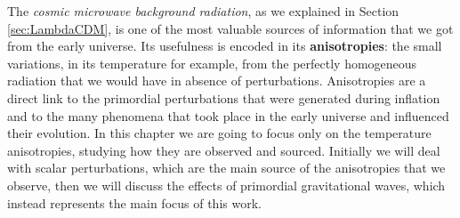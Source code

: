 The \emph{cosmic microwave background radiation}, as we explained in Section \ref{sec:LambdaCDM}, is one of the most valuable sources of information that we got from the early universe. Its usefulness is encoded in its \textbf{anisotropies}: the small variations, in its temperature for example, from the perfectly homogeneous radiation that we would have in absence of perturbations. Anisotropies are a direct link to the primordial perturbations that were generated during inflation and to the many phenomena that took place in the early universe and influenced their evolution. In this chapter we are going to focus only on the temperature anisotropies, studying how they are observed and sourced. Initially we will deal with scalar perturbations, which are the main source of the anisotropies that we observe, then we will discuss the effects of primordial gravitational waves, which instead represents the main focus of this work. 
